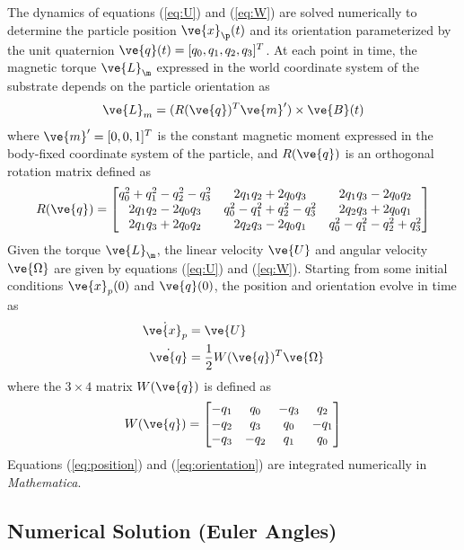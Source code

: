 The dynamics of equations (\ref{eq:U}) and (\ref{eq:W}) are solved numerically to determine the particle position $\ve{x}_{\p}(t)$ and its orientation parameterized by the unit quaternion $\ve{q}(t)=[q_0,q_1,q_2,q_3]^T$. At each point in time, the magnetic torque $\ve{L}_{\m}$ expressed in the world coordinate system of the substrate depends on the particle orientation as
\begin{equation}
    \ve{L}_m = (R(\ve{q})^T\ve{m}')\times \ve{B}(t) \label{eq:Lm}
\end{equation}
where $\ve{m}'=[0,0,1]^T$ is the constant magnetic moment expressed in the body-fixed coordinate system of the particle, and $R(\ve{q})$ is an orthogonal rotation matrix\autocite{Diebel2006} defined as
\begin{equation}
    R(\ve{q}) = \begin{bmatrix}
    q_0^2 + q_1^2 - q_2^2 - q_3^2 & 2q_1q_2 + 2q_0q_3 & 2q_1q_3 - 2q_0q_2 \\
    2q_1q_2 - 2q_0q_3 & q_0^2 - q_1^2 + q_2^2 - q_3^2 & 2q_2q_3 + 2q_0q_1 \\
    2q_1q_3 + 2q_0q_2 & 2q_2q_3 - 2q_0q_1 & q_0^2 - q_1^2 - q_2^2 + q_3^2
    \end{bmatrix}
\end{equation} 
Given the torque $\ve{L}_{\m}$, the linear velocity $\ve{U}$ and angular velocity $\ve{\Omega}$ are given by equations (\ref{eq:U}) and (\ref{eq:W}). Starting from some initial conditions $\ve{x}_p(0)$ and $\ve{q}(0)$, the position and orientation evolve in time as 
\begin{align}
    \dot{\ve{x}_p} &= \ve{U} \label{eq:position}
    \\
    \dot{\ve{q}} &= \frac{1}{2}W(\ve{q})^T \ve{\Omega} \label{eq:orientation}
\end{align}
where the $3\times4$ matrix $W(\ve{q})$ is defined as 
\begin{equation}
    W(\ve{q}) = \begin{bmatrix}
    -q_1 & q_0 & -q_3 & q_2 \\
    -q_2 & q_3 & q_0 & -q_1 \\
    -q_3 & -q_2 & q_1 & q_0
    \end{bmatrix}
\end{equation}
Equations (\ref{eq:position}) and (\ref{eq:orientation}) are integrated numerically in \emph{Mathematica}.


\subsection*{Numerical Solution (Euler Angles)}

